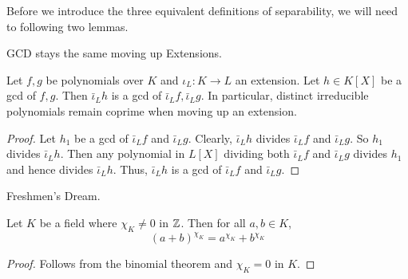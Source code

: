 \documentclass[../book.tex]{subfiles}
\begin{document}
Before we introduce the three equivalent definitions of separability, 
we will need to following two lemmas. 
\begin{lem} GCD stays the same moving up Extensions. 
    
    Let $f, g$ be polynomials over $K$ and $\iota_L : K \to L$ an extension.
    Let $h \in K[X]$ be a gcd of $f, g$. 
    Then $\bar\iota_L h$ is a gcd of $\bar\iota_L f, \bar\iota_L g$. 
    In particular, distinct irreducible polynomials remain coprime 
    when moving up an extension. 
\end{lem}
\begin{proof}
    Let $h_1$ be a gcd of $\bar\iota_L f$ and $\bar\iota_L g$. 
    Clearly, $\bar\iota_L h$ divides $\bar\iota_L f$ and $\bar\iota_L g$. 
    So $h_1$ divides $\bar\iota_L h$. 
    Then any polynomial in $L[X]$ dividing both $\bar\iota_L f$ and $\bar\iota_L g$
    divides $h_1$ and hence divides $\bar\iota_L h$. 
    Thus, $\bar\iota_L h$ is a gcd of $\bar\iota_L f$ and $\bar\iota_L g$. 
\end{proof}
\begin{lem} Freshmen's Dream.
    
    Let $K$ be a field where $\chi_K \neq 0$ in $\mathbb{Z}$. 
    Then for all $a, b \in K$, \[
        (a+b)^{\chi_K} = a^{\chi_K} + b^{\chi_K}
    \]
\end{lem}
\begin{proof}
    Follows from the binomial theorem and $\chi_K = 0$ in $K$. 
\end{proof}
\end{document}
